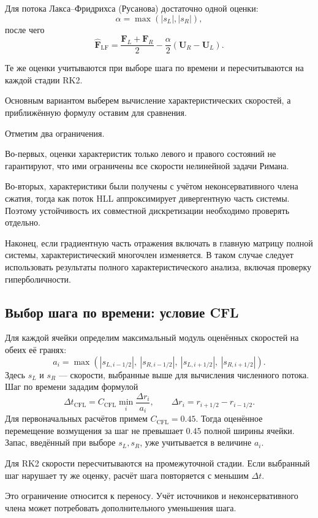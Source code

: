 \documentclass[11pt,a4paper]{article}
\providecommand{\U}{}
\renewcommand{\U}{\bm U}
\newcommand{\F}{\bm F}
\begin{document}
Для потока Лакса--Фридрихса (Русанова)
достаточно одной оценки:
\[
\boxed{\alpha=\max(|s_L|,|s_R|),}
\]
после чего
\[
\widehat{\F}_{\mathrm{LF}}
=\frac{\F_L+\F_R}{2}
-\frac{\alpha}{2}(\U_R-\U_L).
\]

Те же оценки учитываются при выборе
шага по времени и пересчитываются
на каждой стадии RK2.

Основным вариантом выберем вычисление
характеристических скоростей, а приближённую
формулу оставим для сравнения.

Отметим два ограничения.

Во-первых, оценки характеристик только
левого и правого состояний не гарантируют,
что ими ограничены все скорости нелинейной
задачи Римана.

Во-вторых, характеристики были получены
с учётом неконсервативного члена сжатия,
тогда как поток HLL аппроксимирует
дивергентную часть системы. Поэтому
устойчивость их совместной дискретизации
необходимо проверять отдельно.

Наконец, если градиентную часть отражения
включать в главную матрицу полной системы,
характеристический многочлен изменяется.
В таком случае следует использовать
результаты полного характеристического анализа,
включая проверку гиперболичности.

\subsection{Выбор шага по времени: условие CFL}

Для каждой ячейки определим максимальный модуль
оценённых скоростей на обеих её гранях:
\[
a_i=\max\left(
|s_{L,i-1/2}|,\ |s_{R,i-1/2}|,\ 
|s_{L,i+1/2}|,\ |s_{R,i+1/2}|
\right).
\]
Здесь $s_L$ и $s_R$ --- скорости, выбранные выше
для вычисления численного потока. Шаг по времени зададим формулой
\[
\Delta t_{\mathrm{CFL}}
=C_{\mathrm{CFL}}\min_i\frac{\Delta r_i}{a_i},
\qquad
\Delta r_i=r_{i+1/2}-r_{i-1/2}.
\]
Для первоначальных расчётов примем
$C_{\mathrm{CFL}}=0.45$.
Тогда оценённое перемещение возмущения за шаг
не превышает $0.45$ полной ширины ячейки.
Запас, введённый при выборе $s_L,s_R$,
уже учитывается в величине $a_i$.

Для RK2 скорости пересчитываются на промежуточной
стадии. Если выбранный шаг нарушает ту же оценку,
расчёт шага повторяется с меньшим $\Delta t$.

Это ограничение относится к переносу.
Учёт источников и неконсервативного члена
может потребовать дополнительного уменьшения шага.
\end{document}
